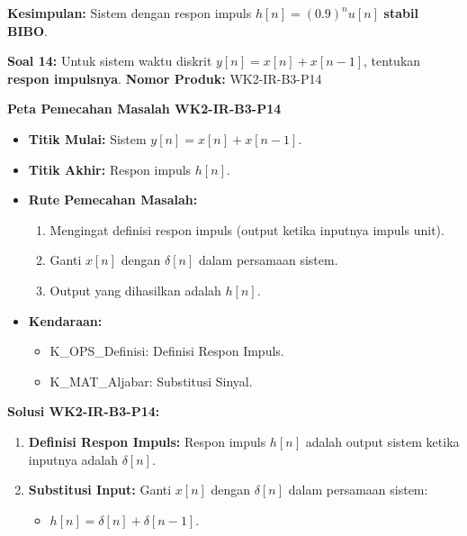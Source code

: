 \documentclass[
  letterpaper,
  DIV=11,
  numbers=noendperiod]{scrreprt}
\providecommand{\tightlist}{%
  \setlength{\itemsep}{0pt}\setlength{\parskip}{0pt}}
\begin{document}
\textbf{Kesimpulan:} Sistem dengan respon impuls \(h[n] = (0.9)^n u[n]\)
\textbf{stabil BIBO}.

\textbf{Soal 14:} Untuk sistem waktu diskrit \(y[n] = x[n] + x[n-1]\),
tentukan \textbf{respon impulsnya}. \textbf{Nomor Produk:} WK2-IR-B3-P14

\textbf{Peta Pemecahan Masalah WK2-IR-B3-P14}

\begin{itemize}
\tightlist
\item
  \textbf{Titik Mulai:} Sistem \(y[n] = x[n] + x[n-1]\).
\item
  \textbf{Titik Akhir:} Respon impuls \(h[n]\).
\item
  \textbf{Rute Pemecahan Masalah:}

  \begin{enumerate}
  \def\labelenumi{\arabic{enumi}.}
  \tightlist
  \item
    Mengingat definisi respon impuls (output ketika inputnya impuls
    unit).
  \item
    Ganti \(x[n]\) dengan \(\delta[n]\) dalam persamaan sistem.
  \item
    Output yang dihasilkan adalah \(h[n]\).
  \end{enumerate}
\item
  \textbf{Kendaraan:}

  \begin{itemize}
  \tightlist
  \item
    K\_OPS\_Definisi: Definisi Respon Impuls.
  \item
    K\_MAT\_Aljabar: Substitusi Sinyal.
  \end{itemize}
\end{itemize}

\textbf{Solusi WK2-IR-B3-P14:}

\begin{enumerate}
\def\labelenumi{\arabic{enumi}.}
\tightlist
\item
  \textbf{Definisi Respon Impuls:} Respon impuls \(h[n]\) adalah output
  sistem ketika inputnya adalah \(\delta[n]\).
\item
  \textbf{Substitusi Input:} Ganti \(x[n]\) dengan \(\delta[n]\) dalam
  persamaan sistem:

  \begin{itemize}
  \tightlist
  \item
    \(h[n] = \delta[n] + \delta[n-1]\).
  \end{itemize}
\end{enumerate}
\end{document}
